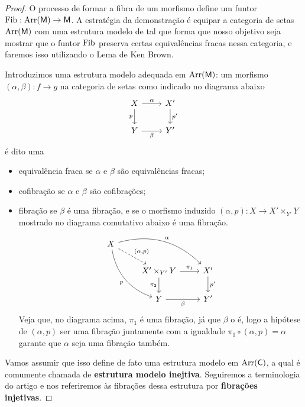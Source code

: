 \begin{proof}
  O processo de formar a fibra de um morfismo define um funtor $\mathrm{Fib}: \mathrm{Arr}(\mathsf{M}) \to \mathsf{M}$.
  A estratégia da demonstração é equipar a categoria de setas $\mathrm{Arr}(\mathsf{M})$ com uma estrutura modelo de tal que forma que nosso objetivo seja mostrar que o funtor $\mathrm{Fib}$ preserva certas equivalências fracas nessa categoria, e faremos isso utilizando o Lema de Ken Brown.

  Introduzimos uma estrutura modelo adequada em $\mathrm{Arr}(\mathsf{M})$: um morfismo $(\alpha,\beta): f \to g$ na categoria de setas como indicado no diagrama abaixo
  \begin{displaymath}
    \begin{tikzcd}
      X
      \arrow[r, "\alpha"]
      \arrow[d, "p" swap]
      & X'
      \arrow[d, "p'"]
      \\ Y
      \arrow[r, "\beta" swap]
      & Y'
    \end{tikzcd}
  \end{displaymath}
  é dito uma
  \begin{itemize}
  \item equivalência fraca se $\alpha$ e $\beta$ são equivalências fracas;
    
  \item cofibração se $\alpha$ e $\beta$ são cofibrações;
    
  \item fibração se $\beta$ é uma fibração, e se o morfismo induzido $(\alpha,p): X \to X' \times_{Y'} Y$ mostrado no diagrama comutativo abaixo é uma fibração.
    \begin{equation}\label{eq:diagrama_fibracao_injetiva}
      \begin{tikzcd}
        X
        \arrow[rrd, bend left=30, "\alpha"]
        \arrow[rdd, bend right=30, "p" swap]
        \arrow[rd, dashed, "{(\alpha,p)}"]
        \\ & X' \times_{Y'} Y
        \arrow[r, "\pi_{1}"]
        \arrow[d, "\pi_{2}" swap]
        & X'
        \arrow[d, "p'"]
        \\ & Y
        \arrow[r, "\beta" swap]
        & Y'
      \end{tikzcd}
    \end{equation}
    Veja que, no diagrama acima, $\pi_{1}$ é uma fibração, já que $\beta$ o é, logo a hipótese de $(\alpha,p)$ ser uma fibração juntamente com a igualdade $\pi_{1} \circ (\alpha,p) = \alpha$ garante que $\alpha$ seja uma fibração também.
  \end{itemize}
  Vamos assumir que isso define de fato uma estrutura modelo em $\mathrm{Arr}(\mathsf{C})$, a qual é comumente chamada de \textbf{estrutura modelo inejtiva}.
  Seguiremos a terminologia do artigo e nos referiremos às fibrações dessa estrutura por \textbf{fibrações injetivas}.


\end{proof}
